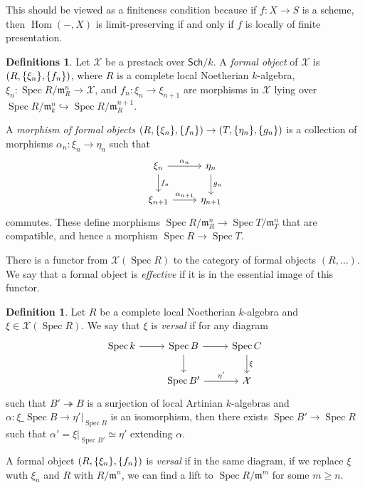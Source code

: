 \documentclass[leqno, openany]{memoir}
\theoremstyle{definition}
\newtheorem{defn}[thm]{Definition}
\newtheorem{defns}[thm]{Definitions}
\theoremstyle{remark}
\theoremstyle{plain}
\theoremstyle{definition}
\theoremstyle{remark}
\newcommand{\mc}[1]{\mathcal{#1}}
\newcommand{\mf}[1]{\mathfrak{#1}}
\newcommand{\ms}[1]{\mathsf{#1}}
\DeclareMathOperator{\Hom}{Hom}
\DeclareMathOperator{\Spec}{Spec}
\begin{document}
This should be viewed as a finiteness condition because if $f \colon X \to S$ is a scheme, then $\Hom(-, X)$ is limit-preserving if and only if $f$ is locally of finite presentation.

\begin{defns}
    Let $\mc{X}$ be a prestack over $\ms{Sch}/k$. A \textit{formal object} of $\mc{X}$ is $(R, \qty{\xi_n}, \qty{f_n})$, where $R$ is a complete local Noetherian $k$-algebra, $\xi_n \colon \Spec R/\mf{m}_R^n \to \mc{X}$, and $f_n \colon \xi_n \to \xi_{n+1}$ are morphisms in $\mc{X}$ lying over $\Spec R/\mf{m}_k^n \hookrightarrow \Spec R/\mf{m}_R^{n+1}$.

    A \textit{morphism of formal objects} $(R, \qty{\xi_n}, \qty{f_n}) \to (T, \qty{\eta_n}, \qty{g_n})$ is a collection of morphisms $\alpha_n \colon \xi_n \to \eta_n$ such that
    \begin{equation*}
    \begin{tikzcd}
        \xi_n \ar{r}{\alpha_n} \ar{d}{f_n} & \eta_n \ar{d}{g_n} \\
        \xi_{n+1} \ar{r}{\alpha_{n+1}} & \eta_{n+1}
    \end{tikzcd}
    \end{equation*}
    commutes. These define morphisms $\Spec R/\mf{m}_R^n \to \Spec T/\mf{m}_T^n$ that are compatible, and hence a morphism $\Spec R \to \Spec T$.
\end{defns}

There is a functor from $\mc{X}(\Spec R)$ to the category of formal objects $(R, \ldots)$. We say that a formal object is \textit{effective} if it is in the essential image of this functor.

\begin{defn}
    Let $R$ be a complete local Noetherian $k$-algebra and $\xi \in \mc{X}(\Spec R)$. We say that $\xi$ is \textit{versal} if for any diagram
    \begin{equation*}
    \begin{tikzcd}
        \Spec k \ar{r} & \Spec B \ar{r} \ar{d} & \Spec C \ar{d}{\xi} \\
        & \Spec B' \ar{r}{\eta'} & \mc{X}
    \end{tikzcd}
    \end{equation*}
    such that $B' \twoheadrightarrow B$ is a surjection of local Artinian $k$-algebras and $\alpha \colon \xi \_{\Spec B} \to \eta' |_{\Spec B}$ is an isomorphism, then there exists $\Spec B' \to \Spec R$ such that $\alpha' = \xi |_{\Spec B'} \simeq \eta'$ extending $\alpha$.

    A formal object $(R, \qty{\xi_n}, \qty{f_n})$ is \textit{versal} if in the same diagram, if we replace $\xi$ wuth $\xi_n$ and $R$ with $R/\mf{m}^n$, we can find a lift to $\Spec R/\mf{m}^m$ for some $m \geq n$.
\end{defn}
\end{document}

